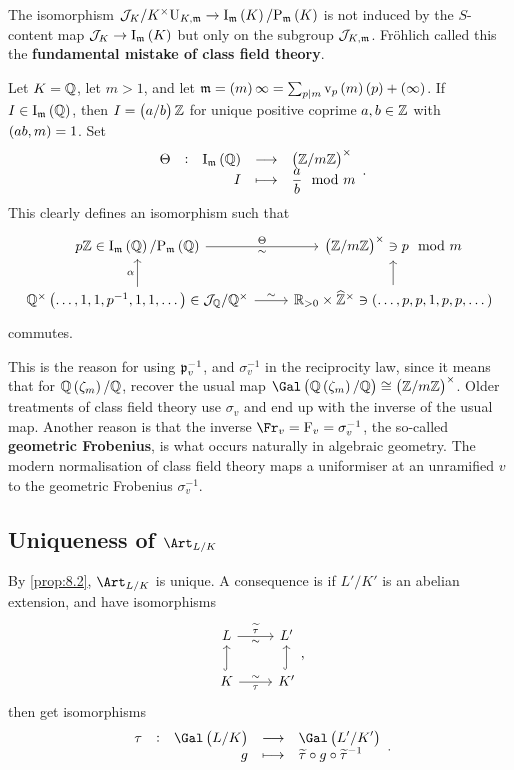 \begin{remark*}
The isomorphism $ \JJJ_K / K^\times\U_{K, \mmm} \to \I_\mmm\br{K} / \P_\mmm\br{K} $ is not induced by the $ S $-content map $ \JJJ_K \to \I_\mmm\br{K} $ but only on the subgroup $ \mathcal{J}_{K, \mathfrak{m}} $. Fr\"ohlich called this the \textbf{fundamental mistake of class field theory}.
\end{remark*}

\begin{example*}
Let $ K = \mathbb{Q} $, let $ m > 1 $, and let $ \mmm = \br{m}\infty = \sum_{p \mid m} \v_p\br{m}\br{p} + \br{\infty} $. If $ I \in \I_\mmm\br{\QQ} $, then $ I = \br{a / b}\ZZ $ for unique positive coprime $ a, b \in \mathbb{Z} $ with $ \br{ab, m} = 1 $. Set
$$ \function[\Theta]{\I_\mmm\br{\QQ}}{\br{\ZZ / m\ZZ}^\times}{I}{\dfrac{a}{b} \mod m}. $$
This clearly defines an isomorphism such that
$$
\begin{tikzcd}
p\ZZ \in \I_\mmm\br{\QQ} / \P_\mmm\br{\QQ} \arrow{r}{\Theta}[swap]{\sim} & \br{\ZZ / m\ZZ}^\times \ni p \mod m \\
\QQ^\times\br{\dots, 1, 1, p^{-1}, 1, 1, \dots} \in \JJJ_\QQ / \QQ^\times \arrow{u}{\alpha} \arrow{r}{\sim} & \RR_{> 0} \times \widehat{\ZZ}^\times \arrow{u} \ni \br{\dots, p, p, 1, p, p, \dots}
\end{tikzcd}
$$
commutes.
\end{example*}

This is the reason for using $ \mathfrak{p}_v^{-1} $, and $ \sigma_v^{-1} $ in the reciprocity law, since it means that for $ \QQ\br{\zeta_m} / \QQ $, recover the usual map $ \Gal\br{\QQ\br{\zeta_m} / \QQ} \cong \br{\ZZ / m\ZZ}^\times $. Older treatments of class field theory use $ \sigma_v $ and end up with the inverse of the usual map. Another reason is that the inverse $ \Fr_v = \F_v = \sigma_v^{-1} $, the so-called \textbf{geometric Frobenius}, is what occurs naturally in algebraic geometry. The modern normalisation of class field theory maps a uniformiser at an unramified $ v $ to the geometric Frobenius $ \sigma_v^{-1} $.

\subsection{Uniqueness of \texorpdfstring{$ \Art_{L / K} $}{the Artin map}}


By \ref{prop:8.2}, $ \Art_{L / K} $ is unique. A consequence is if $ L' / K' $ is an abelian extension, and have isomorphisms
$$
\begin{tikzcd}
L \arrow{r}{\widetilde{\tau}}[swap]{\sim} & L' \\
K \arrow[hookrightarrow]{u} \arrow{r}{\sim}[swap]{\tau} & K' \arrow[hookrightarrow]{u}
\end{tikzcd},
$$
then get isomorphisms
$$ \function[\tau]{\Gal\br{L / K}}{\Gal\br{L' / K'}}{g}{\widetilde{\tau} \circ g \circ \widetilde{\tau}^{-1}}. $$

